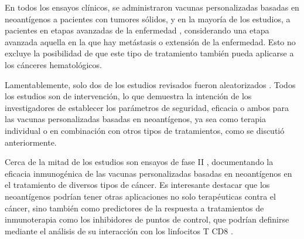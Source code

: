 En todos los ensayos clínicos, se administraron vacunas personalizadas basadas en neoantígenos a pacientes con tumores sólidos, y en la mayoría de los estudios, a pacientes en etapas avanzadas de la enfermedad \cite{cheng2021bertmhc,cafri2020mrna,awad2022personalized,ott2020phase,palmer2022individualized,yu2023preliminary,holm2022neoantigen,mueller2022mass,ellingsen2022characterization,shou2022combination,aggarwal2019immunotherapy,poran2020combined,dillman2018randomized}, considerando una etapa avanzada aquella en la que hay metástasis o extensión de la enfermedad. Esto no excluye la posibilidad de que este tipo de tratamiento también pueda aplicarse a los cánceres hematológicos.


Lamentablemente, solo dos de los estudios revisados fueron aleatorizados \cite{rocconi2022proof,dillman2018randomized}. Todos los estudios son de intervención, lo que demuestra la intención de los investigadores de establecer los parámetros de seguridad, eficacia o ambos para las vacunas personalizadas basadas en neoantígenos, ya sea como terapia individual o en combinación con otros tipos de tratamientos, como se discutió anteriormente.

Cerca de la mitad de los estudios son ensayos de fase II \cite{cheng2021bertmhc, cafri2020mrna, cai2021personalized, yu2023preliminary, holm2022neoantigen, mueller2022mass, ellingsen2022characterization, aggarwal2019immunotherapy, kloor2020frameshift, podaza2020evaluation, sater2020neoadjuvant, dillman2018randomized}, documentando la eficacia inmunogénica de las vacunas personalizadas basadas en neoantígenos en el tratamiento de diversos tipos de cáncer. Es interesante destacar que los neoantígenos podrían tener otras aplicaciones no solo terapéuticas contra el cáncer, sino también como predictores de la respuesta a tratamientos de inmunoterapia como los inhibidores de puntos de control, que podrían definirse mediante el análisis de su interacción con los linfocitos T CD8 \cite{holm2022neoantigen}.


